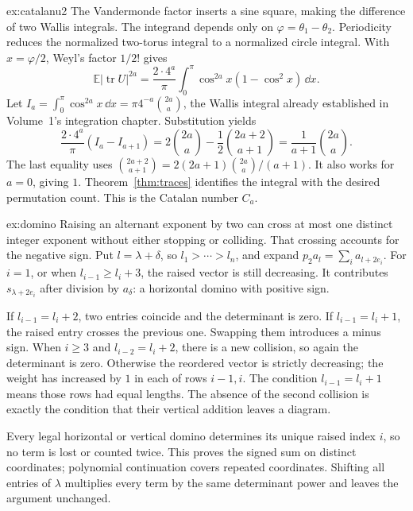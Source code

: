 \begin{solution}{ex:catalanu2}
\idea The Vandermonde factor inserts a sine square, making the difference of two Wallis integrals.
\writeup The integrand depends only on $\varphi=\theta_1-\theta_2$. Periodicity reduces the normalized two-torus integral to a normalized circle integral. With $x=\varphi/2$, Weyl's factor $1/2!$ gives
\[
\mathbb E|\operatorname{tr}U|^{2a}
=\frac{2\cdot4^a}\pi\int_0^\pi\cos^{2a}x(1-\cos^2x)\,\dd x.
\]
Let $I_a=\int_0^\pi\cos^{2a}x\,\dd x=\pi4^{-a}\binom{2a}{a}$, the Wallis integral already established in Volume~1's integration chapter. Substitution yields
\[
\frac{2\cdot4^a}\pi(I_a-I_{a+1})
=2\binom{2a}{a}-\frac12\binom{2a+2}{a+1}
=\frac1{a+1}\binom{2a}{a}.
\]
The last equality uses $\binom{2a+2}{a+1}=2(2a+1)\binom{2a}{a}/(a+1)$. It also works for $a=0$, giving $1$. Theorem~\ref{thm:traces} identifies the integral with the desired permutation count. This is the Catalan number $C_a$.
\end{solution}

\begin{solution}{ex:domino}
\idea Raising an alternant exponent by two can cross at most one distinct integer exponent without either stopping or colliding. That crossing accounts for the negative sign.
\writeup Put $l=\lambda+\delta$, so $l_1>\cdots>l_n$, and expand
$p_2a_l=\sum_i a_{l+2e_i}$.
For $i=1$, or when $l_{i-1}\ge l_i+3$, the raised vector is still decreasing. It contributes $s_{\lambda+2e_i}$ after division by $a_\delta$: a horizontal domino with positive sign.

If $l_{i-1}=l_i+2$, two entries coincide and the determinant is zero. If $l_{i-1}=l_i+1$, the raised entry crosses the previous one. Swapping them introduces a minus sign. When $i\ge3$ and $l_{i-2}=l_i+2$, there is a new collision, so again the determinant is zero. Otherwise the reordered vector is strictly decreasing; the weight has increased by $1$ in each of rows $i-1,i$. The condition $l_{i-1}=l_i+1$ means those rows had equal lengths. The absence of the second collision is exactly the condition that their vertical addition leaves a diagram.

Every legal horizontal or vertical domino determines its unique raised index $i$, so no term is lost or counted twice. This proves the signed sum on distinct coordinates; polynomial continuation covers repeated coordinates. Shifting all entries of $\lambda$ multiplies every term by the same determinant power and leaves the argument unchanged.
\end{solution}


